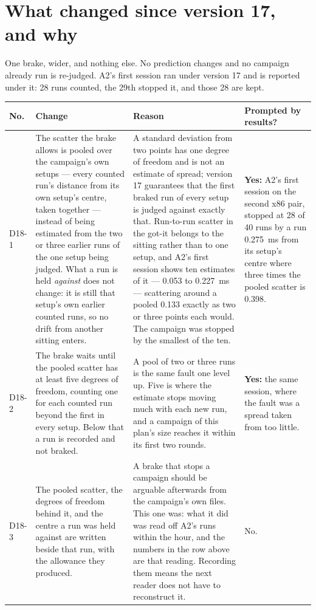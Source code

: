 \documentclass[11pt]{article}
\begin{document}
\section*{What changed since version 17, and why}
One brake, wider, and nothing else. No prediction changes and no campaign already run is
re-judged. A2's first session ran under version 17 and is reported under it: 28 runs counted, the
29th stopped it, and those 28 are kept.

{\small
\begin{longtable}{@{}p{1.1cm} >{\raggedright\arraybackslash}p{6.1cm} >{\raggedright\arraybackslash}p{6.0cm} >{\raggedright\arraybackslash}p{2.2cm}@{}}
\toprule
\textbf{No.} & \textbf{Change} & \textbf{Reason} & \textbf{Prompted by results?} \\
\midrule
\endhead
D18-1 & The scatter the brake allows is pooled over the campaign's own setups --- every counted run's distance from its own setup's centre, taken together --- instead of being estimated from the two or three earlier runs of the one setup being judged. What a run is held \emph{against} does not change: it is still that setup's own earlier counted runs, so no drift from another sitting enters. & A standard deviation from two points has one degree of freedom and is not an estimate of spread; version 17 guarantees that the first braked run of every setup is judged against exactly that. Run-to-run scatter in the got-it belongs to the sitting rather than to one setup, and A2's first session shows ten estimates of it --- 0.053 to 0.227~ms --- scattering around a pooled 0.133 exactly as two or three points each would. The campaign was stopped by the smallest of the ten. & \textbf{Yes:} A2's first session on the second x86 pair, stopped at 28 of 40 runs by a run 0.275~ms from its setup's centre where three times the pooled scatter is 0.398. \\
D18-2 & The brake waits until the pooled scatter has at least five degrees of freedom, counting one for each counted run beyond the first in every setup. Below that a run is recorded and not braked. & A pool of two or three runs is the same fault one level up. Five is where the estimate stops moving much with each new run, and a campaign of this plan's size reaches it within its first two rounds. & \textbf{Yes:} the same session, where the fault was a spread taken from too little. \\
D18-3 & The pooled scatter, the degrees of freedom behind it, and the centre a run was held against are written beside that run, with the allowance they produced. & A brake that stops a campaign should be arguable afterwards from the campaign's own files. This one was: what it did was read off A2's runs within the hour, and the numbers in the row above are that reading. Recording them means the next reader does not have to reconstruct it. & No. \\
\bottomrule
\end{longtable}}
\end{document}

